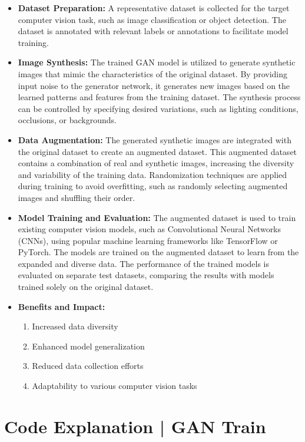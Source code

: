 \documentclass[11pt,a4paper]{article}
\begin{document}
\begin{itemize}[leftmargin=*]
\item \textbf{Dataset Preparation:} A representative dataset is collected for the target computer vision task, such as image classification or object detection. The dataset is annotated with relevant labels or annotations to facilitate model training.

\item \textbf{Image Synthesis:} The trained GAN model is utilized to generate synthetic images that mimic the characteristics of the original dataset. By providing input noise to the generator network, it generates new images based on the learned patterns and features from the training dataset. The synthesis process can be controlled by specifying desired variations, such as lighting conditions, occlusions, or backgrounds.

\item \textbf{Data Augmentation:} The generated synthetic images are integrated with the original dataset to create an augmented dataset. This augmented dataset contains a combination of real and synthetic images, increasing the diversity and variability of the training data. Randomization techniques are applied during training to avoid overfitting, such as randomly selecting augmented images and shuffling their order.

\item \textbf{Model Training and Evaluation:} The augmented dataset is used to train existing computer vision models, such as Convolutional Neural Networks (CNNs), using popular machine learning frameworks like TensorFlow or PyTorch. The models are trained on the augmented dataset to learn from the expanded and diverse data. The performance of the trained models is evaluated on separate test datasets, comparing the results with models trained solely on the original dataset.

\item \textbf{Benefits and Impact:}
\begin{enumerate}
\item Increased data diversity
\item Enhanced model generalization
\item Reduced data collection efforts
\item Adaptability to various computer vision tasks
\end{enumerate}
\end{itemize} 

\section{Code Explanation | GAN Train}
\end{document}
